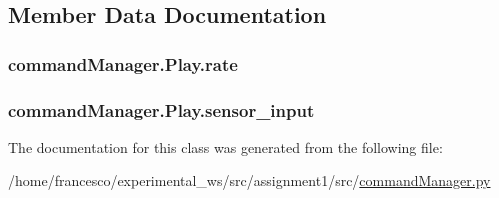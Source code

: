 \subsection{Member Data Documentation}
\subsubsection[{\texorpdfstring{rate}{rate}}]{\setlength{\rightskip}{0pt plus 5cm}command\+Manager.\+Play.\+rate}\hypertarget{classcommandManager_1_1Play_a34aba8df5dfec3560f194934b7e377ad}{}\label{classcommandManager_1_1Play_a34aba8df5dfec3560f194934b7e377ad}
\subsubsection[{\texorpdfstring{sensor\+\_\+input}{sensor_input}}]{\setlength{\rightskip}{0pt plus 5cm}command\+Manager.\+Play.\+sensor\+\_\+input}\hypertarget{classcommandManager_1_1Play_a0588ea1cd0e235e5211442eff52952c1}{}\label{classcommandManager_1_1Play_a0588ea1cd0e235e5211442eff52952c1}


The documentation for this class was generated from the following file\+:\begin{DoxyCompactItemize}
\item 
/home/francesco/experimental\+\_\+ws/src/assignment1/src/\hyperlink{commandManager_8py}{command\+Manager.\+py}\end{DoxyCompactItemize}
